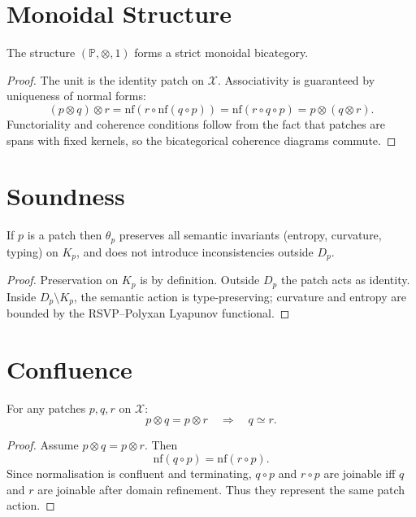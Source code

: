 \section{Monoidal Structure}

\begin{theorem}
The structure $(\mathbb{P},\otimes,1)$ forms a strict monoidal bicategory.
\end{theorem}

\begin{proof}
The unit is the identity patch on $\mathcal{X}$.
Associativity is guaranteed by uniqueness of normal forms:
\[
(p\otimes q)\otimes r
= \mathrm{nf}(r\circ\mathrm{nf}(q\circ p))
= \mathrm{nf}(r\circ q\circ p)
= p\otimes(q\otimes r).
\]
Functoriality and coherence conditions follow from the fact that patches
are spans with fixed kernels, so the bicategorical coherence diagrams commute.
\end{proof}

\section{Soundness}

\begin{theorem}
If $p$ is a patch then $\theta_p$ preserves all semantic invariants
(entropy, curvature, typing) on $K_p$, and does not introduce inconsistencies
outside $D_p$.
\end{theorem}

\begin{proof}
Preservation on $K_p$ is by definition.
Outside $D_p$ the patch acts as identity.
Inside $D_p\setminus K_p$, the semantic action is type-preserving; curvature and entropy
are bounded by the RSVP–Polyxan Lyapunov functional.
\end{proof}

\section{Confluence}

\begin{theorem}
For any patches $p,q,r$ on $\mathcal{X}$:
\[
p\otimes q = p\otimes r \quad\Longrightarrow\quad q \simeq r.
\]
\end{theorem}

\begin{proof}
Assume $p\otimes q = p\otimes r$.
Then
\[
\mathrm{nf}(q\circ p) = \mathrm{nf}(r\circ p).
\]
Since normalisation is confluent and terminating, $q\circ p$ and $r\circ p$
are joinable iff $q$ and $r$ are joinable after domain refinement.
Thus they represent the same patch action.
\end{proof}


